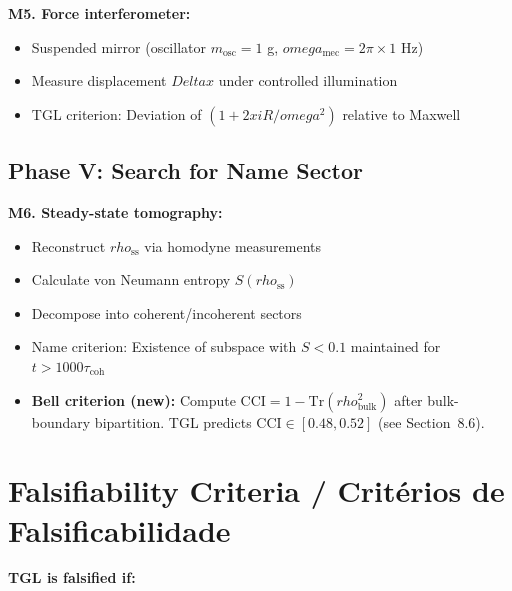 \documentclass[12pt,a4paper]{article}
\def\xi{xi}%
\def\rho{rho}%
\def\omega{omega}%
\def\Delta{Delta}%
\begin{document}
\textbf{M5. Force interferometer:}
\begin{itemize}
    \item Suspended mirror (oscillator $m_{\text{osc}} = 1$ g, $\omega_{\text{mec}} = 2\pi \times 1$ Hz)
    \item Measure displacement $\Delta x$ under controlled illumination
    \item TGL criterion: Deviation of $(1 + 2\xi R/\omega^2)$ relative to Maxwell
\end{itemize}

\subsection{Phase V: Search for Name Sector}

\textbf{M6. Steady-state tomography:}
\begin{itemize}
    \item Reconstruct $\rho_{\text{ss}}$ via homodyne measurements
    \item Calculate von Neumann entropy $S(\rho_{\text{ss}})$
    \item Decompose into coherent/incoherent sectors
    \item Name criterion: Existence of subspace with $S < 0.1$ maintained for $t > 1000\tau_{\text{coh}}$
    \item \textbf{Bell criterion (new):} Compute $\mathrm{CCI} = 1 - \mathrm{Tr}(\rho_{\mathrm{bulk}}^2)$ after bulk-boundary bipartition. TGL predicts $\mathrm{CCI} \in [0.48, 0.52]$ (see Section~8.6).
\end{itemize}

\section{Falsifiability Criteria / Critérios de Falsificabilidade}

\textbf{TGL is falsified if:}
\end{document}
